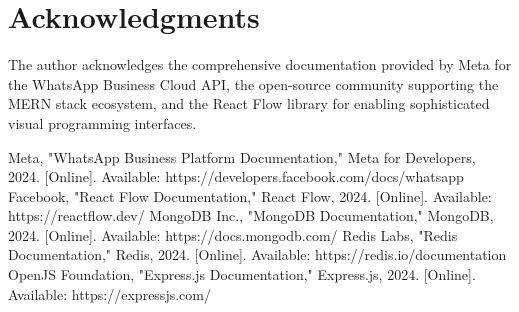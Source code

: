 \documentclass[conference]{IEEEtran}
\begin{document}
\section{Acknowledgments}

The author acknowledges the comprehensive documentation provided by Meta for the WhatsApp Business Cloud API, the open-source community supporting the MERN stack ecosystem, and the React Flow library for enabling sophisticated visual programming interfaces.

\begin{thebibliography}{00}
 Meta, "WhatsApp Business Platform Documentation," Meta for Developers, 2024. [Online]. Available: https://developers.facebook.com/docs/whatsapp
 Facebook, "React Flow Documentation," React Flow, 2024. [Online]. Available: https://reactflow.dev/
 MongoDB Inc., "MongoDB Documentation," MongoDB, 2024. [Online]. Available: https://docs.mongodb.com/
 Redis Labs, "Redis Documentation," Redis, 2024. [Online]. Available: https://redis.io/documentation
 OpenJS Foundation, "Express.js Documentation," Express.js, 2024. [Online]. Available: https://expressjs.com/
\end{thebibliography}
\end{document}
